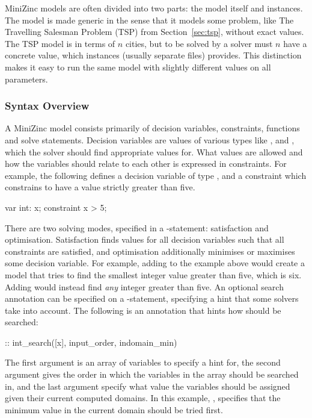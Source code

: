 \documentclass[a4paper,12pt]{article}
\begin{document}
MiniZinc models are often divided into two parts: the model itself and instances. The
model is made generic in the sense that it models some problem, like The Travelling
Salesman Problem (TSP) from
Section~\ref{sec:tsp}, without exact values. The TSP model is in terms of $n$ cities, but
to be solved by a solver must $n$ have a concrete value, which instances (usually separate
files) provides. This distinction makes it easy to run the same model with slightly
different values on all parameters.

\subsubsection{Syntax Overview}\label{sec:mzn:syntax}
A MiniZinc model consists primarily of decision variables, constraints,
functions and solve statements. Decision variables are values of various types like
,  and , which the solver should find appropriate values for.
What values are allowed and how the variables should relate to each other is expressed in
constraints. For example, the following defines a decision variable  of type
, and a constraint which constrains  to have a value strictly greater than
five.
\begin{mznnobreak}
var int: x;
constraint x > 5;
\end{mznnobreak}

\begin{sloppypar}
There are two solving modes, specified in a -statement: satisfaction and optimisation. Satisfaction
finds values for all decision variables such that all constraints are satisfied, and
optimisation additionally minimises or maximises some decision variable.
For example, adding  to the example above would create a
model that tries to find the smallest integer value greater than five, which is
six. Adding  would instead find \emph{any} integer greater than
five. An optional search annotation can be specified on a -statement, specifying
a hint that some solvers take into account. The following is an annotation that
hints how  should be searched:
\end{sloppypar}
\begin{mznnobreak}
:: int_search([x], input_order, indomain_min)
\end{mznnobreak}
The first argument is an array of variables to specify a hint for, the
second argument gives the order in which the variables in the array should be searched in,
and the last argument specify what value the variables should be assigned given their
current computed domains. In this example, , specifies that the minimum
value in the current domain should be tried first.
\end{document}
